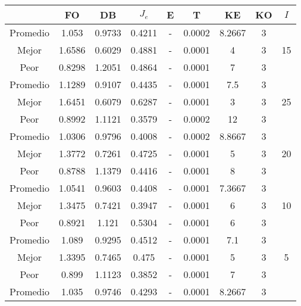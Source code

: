 \begin{table}[h!]
    \footnotesize
    \begin{center}
        \begin{tabular}{|c|c|c|c|c|c|c|c|c|}
        \hline
            & {\bf FO} & {\bf DB} & $J_e$ & {\bf E} & {\bf T} & {\bf KE} & {\bf KO} & $I$\\
        \hline
        \hline
            Promedio  & 1.053 & 0.9733 & 0.4211 & - & 0.0002 & 8.2667 & 3 & \\
            \cline{1-8}
            Mejor & 1.6586 & 0.6029  & 0.4881 & - & 0.0001 & 4 & 3 & 15\\
            \cline{1-8}
            Peor & 0.8298 & 1.2051  & 0.4864 & - & 0.0001 & 7 & 3 & \\
        \hline
        \hline
            Promedio  & 1.1289 & 0.9107 & 0.4435 & - & 0.0001 & 7.5 & 3 & \\
            \cline{1-8}
            Mejor & 1.6451 & 0.6079  & 0.6287 & - & 0.0001 & 3 & 3 & 25\\
            \cline{1-8}
            Peor & 0.8992 & 1.1121  & 0.3579 & - & 0.0002 & 12 & 3 & \\
        \hline
        \hline
            Promedio  & 1.0306 & 0.9796 & 0.4008 & - & 0.0002 & 8.8667 & 3 & \\
            \cline{1-8}
            Mejor & 1.3772 & 0.7261  & 0.4725 & - & 0.0001 & 5 & 3 & 20\\
            \cline{1-8}
            Peor & 0.8788 & 1.1379  & 0.4416 & - & 0.0001 & 8 & 3 & \\
        \hline
        \hline
            Promedio  & 1.0541 & 0.9603 & 0.4408 & - & 0.0001 & 7.3667 & 3 & \\
            \cline{1-8}
            Mejor & 1.3475 & 0.7421  & 0.3947 & - & 0.0001 & 6 & 3 & 10\\
            \cline{1-8}
            Peor & 0.8921 & 1.121  & 0.5304 & - & 0.0001 & 6 & 3 & \\
        \hline
        \hline
            Promedio  & 1.089 & 0.9295 & 0.4512 & - & 0.0001 & 7.1 & 3 & \\
            \cline{1-8}
            Mejor & 1.3395 & 0.7465  & 0.475 & - & 0.0001 & 5 & 3 & 5\\
            \cline{1-8}
            Peor & 0.899 & 1.1123  & 0.3852 & - & 0.0001 & 7 & 3 & \\
        \hline
        \hline
            Promedio  & 1.035 & 0.9746 & 0.4293 & - & 0.0001 & 8.2667 & 3 & \\

\end{tabular}
\end{center}
\end{table}
